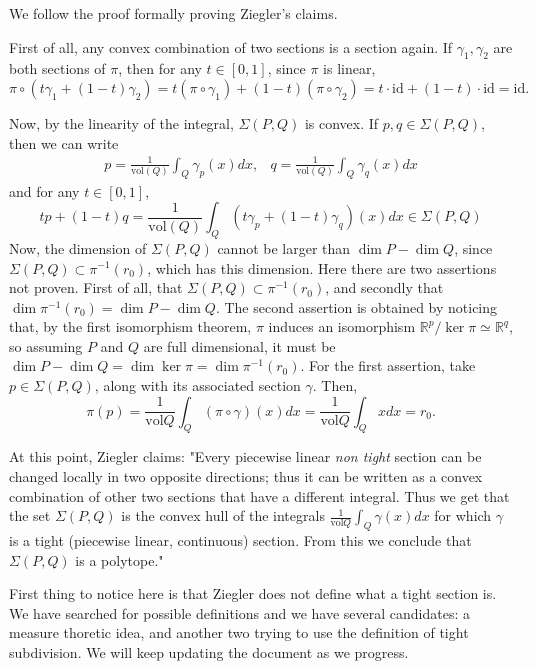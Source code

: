 \documentclass[12pt,a4paper]{article}
\newcommand{\RR}{\mathbb{R}}
\newcommand{\vol}{\text{vol}}
\begin{document}
We follow the proof formally proving Ziegler's claims. 

First of all, any convex combination of two sections is a section again.
If $\gamma_1, \gamma_2$ are both sections of $\pi$, then for any $t\in [0,1]$, since $\pi$ is linear,
$$\pi \circ (t\gamma_1+(1-t)\gamma_2)= t(\pi\circ \gamma_1) + (1-t)(\pi \circ \gamma_2) = t\cdot \text{id}+(1-t)\cdot\text{id}=\text{id}.$$

Now, by the linearity of the integral, $\Sigma(P,Q)$ is convex. 
If $p,q\in \Sigma(P,Q)$, then we can write
$$
\begin{array}{cc}
 p=\frac{1}{\text{vol}(Q)}\int_Q \gamma_p(x) dx, & q=\frac{1}{\text{vol}(Q)}\int_Q \gamma_q(x) dx
\end{array}
$$
and for any $t\in[0,1]$, 
$$tp+(1-t)q = \frac{1}{\text{vol}(Q)}\int_Q (t\gamma_p + (1-t)\gamma_q)(x) dx \in \Sigma(P,Q)$$
Now, the dimension of $\Sigma(P,Q)$ cannot be larger than $\dim P - \dim Q$, since $\Sigma(P,Q)\subset \pi^{-1}(r_0)$, which has this dimension. Here there are two assertions not proven. 
First of all, that $\Sigma(P,Q)\subset \pi^{-1}(r_0)$, and secondly that $\dim \pi^{-1}(r_0)=\dim P - \dim Q$. 
The second assertion is obtained by noticing that, by the first isomorphism theorem, $\pi$ induces an isomorphism $\RR^p/\ker \pi \simeq \RR^q$, so assuming $P$ and $Q$ are full dimensional, it must be $\dim P - \dim Q = \dim \ker \pi = \dim \pi^{-1}(r_0)$. 
For the first assertion, take $p\in \Sigma(P,Q)$, along with its associated section $\gamma$. 
Then, 
$$\pi(p)=\frac{1}{\vol Q} \int_Q (\pi \circ \gamma)(x) dx = \frac{1}{\vol Q} \int_Q x dx =r_0.$$

At this point, Ziegler claims: "Every piecewise linear \textit{non tight} section can be changed locally in two opposite directions; thus it can be written as a convex combination of other two sections that have a different integral. Thus we get that the set $\Sigma(P, Q)$ is the convex hull of the integrals $\frac{1}{\vol Q}\int_Q \gamma(x)dx$ for which $\gamma$ is a tight (piecewise linear, continuous) section. From this we conclude that $\Sigma(P, Q)$ is a polytope."

First thing to notice here is that Ziegler does not define what a tight section is. 
We have searched for possible definitions and we have several candidates: a measure thoretic idea, and another two trying to use the definition of tight subdivision. 
We will keep updating the document as we progress.
\end{document}
